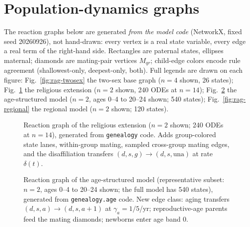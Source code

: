 \documentclass[11pt,a4paper]{article}
\begin{document}
\section{Population-dynamics graphs}
\label{sec:rags}
The reaction graphs below are generated \emph{from the model code}
(NetworkX, fixed seed 20260926), not hand-drawn: every vertex is a real
state variable, every edge a real term of the right-hand side.
Rectangles are paternal states, ellipses maternal; diamonds are
mating-pair vertices $M_{qr}$; child-edge colors encode rule agreement
(shallowest-only, deepest-only, both).  Full legends are drawn on each
figure: Fig.~\ref{fig:rag-twosex} the two-sex base graph ($n=4$ shown, 26
states); Fig.~\ref{fig:rag-religious} the religious extension ($n=2$
shown, 240 ODEs at $n=14$); Fig.~\ref{fig:rag-age} the age-structured
model ($n=2$, ages 0--4 to 20--24 shown; 540 states); Fig.~\ref{fig:rag-regional}
the regional model ($n=2$ shown; 120 states).

\begin{figure}[htbp]
\centering
\resizebox{0.6\textwidth}{!}{}
\caption{Reaction graph of the two-sex model (representative $n=4$),
generated from \texttt{genealogy} code.  Vertices: cluster states
$(d,\alpha)$, immigration source, death/emigration sinks, mating-pair
diamonds $M_{qr}$.  Edges: immigration into $C_0$, catalytic mating,
child edges colored by rule agreement, death and emigration to sinks.}
\label{fig:rag-twosex}

\vspace{0.8em}
\resizebox{0.6\textwidth}{!}{}
\caption{Reaction graph of the religious extension ($n=2$ shown; 240
ODEs at $n=14$), generated from \texttt{genealogy} code.  Adds
group-colored state lanes, within-group mating, sampled cross-group
mating edges, and the disaffiliation transfers
$(d,s,g)\to(d,s,\mathrm{una})$ at rate $\delta(t)$.}
\label{fig:rag-religious}
\end{figure}

\begin{figure}[htbp]
\centering
\resizebox{0.6\textwidth}{!}{}
\caption{Reaction graph of the age-structured model (representative
subset: $n=2$, ages 0--4 to 20--24 shown; the full model has 540
states), generated from \texttt{genealogy.age} code.  New edge class:
aging transfers $(d,s,a)\to(d,s,a+1)$ at $\gamma_a=1/5$/yr;
reproductive-age parents feed the mating diamonds; newborns enter age
band 0.}
\label{fig:rag-age}
\end{figure}
\end{document}
